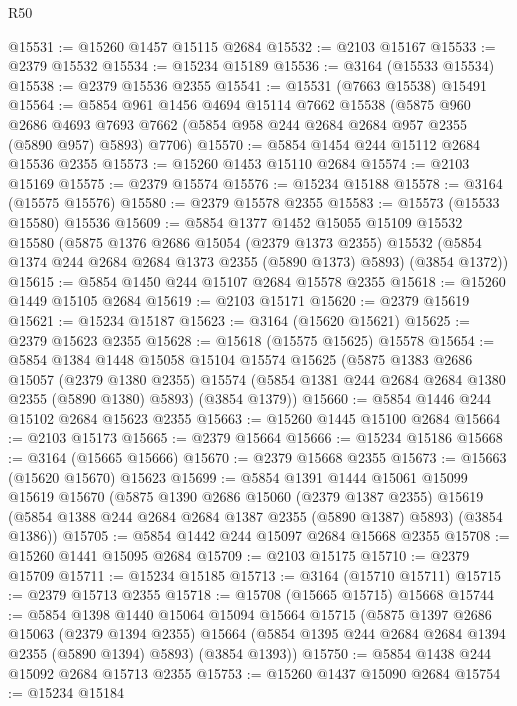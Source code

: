 \begin{lexlean}{R50}
\begin{coremodule}
@15531 := @15260 @1457 @15115 @2684
@15532 := @2103 @15167
@15533 := @2379 @15532
@15534 := @15234 @15189
@15536 := @3164 (@15533 @15534)
@15538 := @2379 @15536 @2355
@15541 := @15531 (@7663 @15538) @15491
@15564 := @5854
    @961
    @1456
    @4694
    @15114
    @7662
    @15538
    (@5875
      @960
      @2686
      @4693
      @7693
      @7662
      (@5854 @958 @244 @2684 @2684 @957 @2355 (@5890 @957) @5893)
      @7706)
@15570 := @5854 @1454 @244 @15112 @2684 @15536 @2355
@15573 := @15260 @1453 @15110 @2684
@15574 := @2103 @15169
@15575 := @2379 @15574
@15576 := @15234 @15188
@15578 := @3164 (@15575 @15576)
@15580 := @2379 @15578 @2355
@15583 := @15573 (@15533 @15580) @15536
@15609 := @5854
    @1377
    @1452
    @15055
    @15109
    @15532
    @15580
    (@5875
      @1376
      @2686
      @15054
      (@2379 @1373 @2355)
      @15532
      (@5854 @1374 @244 @2684 @2684 @1373 @2355 (@5890 @1373) @5893)
      (@3854 @1372))
@15615 := @5854 @1450 @244 @15107 @2684 @15578 @2355
@15618 := @15260 @1449 @15105 @2684
@15619 := @2103 @15171
@15620 := @2379 @15619
@15621 := @15234 @15187
@15623 := @3164 (@15620 @15621)
@15625 := @2379 @15623 @2355
@15628 := @15618 (@15575 @15625) @15578
@15654 := @5854
    @1384
    @1448
    @15058
    @15104
    @15574
    @15625
    (@5875
      @1383
      @2686
      @15057
      (@2379 @1380 @2355)
      @15574
      (@5854 @1381 @244 @2684 @2684 @1380 @2355 (@5890 @1380) @5893)
      (@3854 @1379))
@15660 := @5854 @1446 @244 @15102 @2684 @15623 @2355
@15663 := @15260 @1445 @15100 @2684
@15664 := @2103 @15173
@15665 := @2379 @15664
@15666 := @15234 @15186
@15668 := @3164 (@15665 @15666)
@15670 := @2379 @15668 @2355
@15673 := @15663 (@15620 @15670) @15623
@15699 := @5854
    @1391
    @1444
    @15061
    @15099
    @15619
    @15670
    (@5875
      @1390
      @2686
      @15060
      (@2379 @1387 @2355)
      @15619
      (@5854 @1388 @244 @2684 @2684 @1387 @2355 (@5890 @1387) @5893)
      (@3854 @1386))
@15705 := @5854 @1442 @244 @15097 @2684 @15668 @2355
@15708 := @15260 @1441 @15095 @2684
@15709 := @2103 @15175
@15710 := @2379 @15709
@15711 := @15234 @15185
@15713 := @3164 (@15710 @15711)
@15715 := @2379 @15713 @2355
@15718 := @15708 (@15665 @15715) @15668
@15744 := @5854
    @1398
    @1440
    @15064
    @15094
    @15664
    @15715
    (@5875
      @1397
      @2686
      @15063
      (@2379 @1394 @2355)
      @15664
      (@5854 @1395 @244 @2684 @2684 @1394 @2355 (@5890 @1394) @5893)
      (@3854 @1393))
@15750 := @5854 @1438 @244 @15092 @2684 @15713 @2355
@15753 := @15260 @1437 @15090 @2684
@15754 := @15234 @15184

\end{coremodule}
\end{lexlean}
